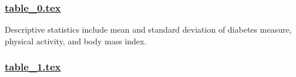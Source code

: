 \documentclass[11pt]{article}
\begin{document}
\subsubsection*{\hyperlink{code-LaTeX Table Design-table-0-tex}{table\_0.tex}}

\begin{codeoutput}
\begin{table}[h]
\caption{Descriptive Statistics of Main Binary Variables and Body Mass Index Stratified by Gender}
\label{table:DescriptiveStatistics}
\begin{threeparttable}
\renewcommand{\TPTminimum}{\linewidth}
\begin{tablenotes}
\footnotesize
\item Descriptive statistics include mean and standard deviation of diabetes measure, physical activity, and body mass index.
\end{tablenotes}
\end{threeparttable}
\end{table}

\end{codeoutput}

\subsubsection*{\hyperlink{code-LaTeX Table Design-table-1-tex}{table\_1.tex}}
\end{document}
